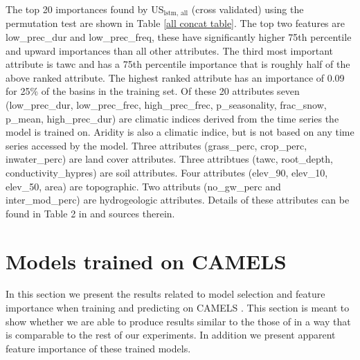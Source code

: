 The top 20 importances found by US$_\text{lstm, all}$ (cross validated) using the permutation test 
are shown in Table \ref{all concat table}. The top two features are low\_prec\_dur 
and low\_prec\_freq, these have significantly higher 75th percentile and upward 
importances than all other attributes. The third most important attribute is 
tawc and has a 75th percentile importance that is roughly half of the above ranked 
attribute. The highest ranked attribute has an importance of 0.09 for 25\% of the 
basins in the training set. Of these 20 attributes seven (low\_prec\_dur, low\_prec\_frec, 
high\_prec\_frec, p\_seasonality, frac\_snow, p\_mean, high\_prec\_dur) are climatic indices 
derived from the time series the model is trained on. Aridity is also a climatic indice, 
but is not based on any time series accessed by the model. Three attributes (grass\_perc, 
crop\_perc, inwater\_perc) are land cover attributes. Three attribtues (tawc, 
root\_depth, conductivity\_hypres) are soil attributes. Four attributes (elev\_90,
elev\_10, elev\_50, area) are topographic. Two attributs (no\_gw\_perc and 
inter\_mod\_perc) are hydrogeologic attributes. Details of these attributes 
can be found in Table 2 in \citet{CAMELS_GB} and sources therein.

\section{Models trained on CAMELS}
In this section we present the results related to model selection and feature 
importance when training and predicting on CAMELS \citep{CAMELS_US}. This section 
is meant to show whether we are able to produce results similar to the those of 
\citet{lstm_third_paper} in a way that is comparable to the rest of our experiments.
In addition we present apparent feature importance of these trained models.
